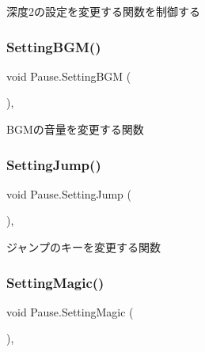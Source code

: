 深度2の設定を変更する関数を制御する 

\mbox{\label{class_pause_aaf1a1ade7e3f8d741a454bc3dd4a2a39}} 
\subsubsection{\texorpdfstring{Setting\+B\+G\+M()}{SettingBGM()}}
{\footnotesize\ttfamily void Pause.\+Setting\+B\+GM (\begin{DoxyParamCaption}{ }\end{DoxyParamCaption})\hspace{0.3cm}{\ttfamily [inline]}, {\ttfamily [private]}}



B\+G\+Mの音量を変更する関数 

\mbox{\label{class_pause_a5dff9113158ef08a7c9ee48b12827b22}} 
\subsubsection{\texorpdfstring{Setting\+Jump()}{SettingJump()}}
{\footnotesize\ttfamily void Pause.\+Setting\+Jump (\begin{DoxyParamCaption}{ }\end{DoxyParamCaption})\hspace{0.3cm}{\ttfamily [inline]}, {\ttfamily [private]}}



ジャンプのキーを変更する関数 

\mbox{\label{class_pause_ac6996ec18e769c7af8b0f29a4d78e8d7}} 
\subsubsection{\texorpdfstring{Setting\+Magic()}{SettingMagic()}}
{\footnotesize\ttfamily void Pause.\+Setting\+Magic (\begin{DoxyParamCaption}{ }\end{DoxyParamCaption})\hspace{0.3cm}{\ttfamily [inline]}, {\ttfamily [private]}}



